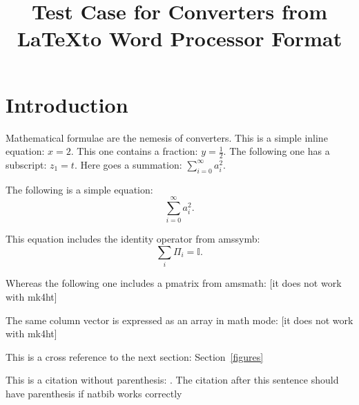 \documentclass{article}
\title{Test Case for Converters from \LaTeX to Word Processor Format}
\author{}
\begin{document}
\maketitle

\section{Introduction}
Mathematical formulae are the nemesis of converters. This is a simple inline equation: $x=2$. This one contains a fraction: $y=\frac{1}{2}$. The following one has a subscript: $z_{1}=t$. Here goes a summation: $\sum_{i=0}^{\infty}a_{i}^{2}$.

The following is a simple equation:
\begin{equation}
  \sum_{i=0}^{\infty}a_{i}^{2}.
\end{equation}

This equation includes the identity operator from amssymb:
\begin{equation}
  \sum_{i}\Pi_{i}=\mathbb{I}.
\end{equation}

Whereas the following one includes a pmatrix from amsmath: [it does not work with mk4ht]

The same column vector is expressed as an array in math mode: [it does not work with mk4ht]

This is a cross reference to the next section: Section~\ref{figures}

This is a citation without parenthesis: \cite{dummy2013least}. The citation after this sentence should have parenthesis if natbib works correctly~\citep{dummy2013least}
\end{document}
